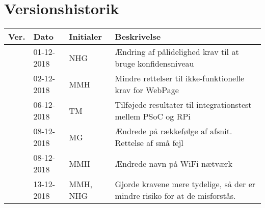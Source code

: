 \documentclass[Kravspecifikation/Kravspec_Main.tex]{subfiles}
\begin{document}
\section{Versionshistorik}
\begin{longtable}{|L{0.07\textwidth}|L{0.15\textwidth}|L{0.13\textwidth}|L{0.55\textwidth}|}
        \hline
        \textbf{Ver.} & \textbf{Dato} & \textbf{Initialer} & \textbf{Beskrivelse}  \\ \hline
         & 01-12-2018 & NHG & Ændring af pålidelighed krav til at bruge konfidensniveau \\ \hline
         & 02-12-2018 & MMH & Mindre rettelser til ikke-funktionelle krav for WebPage \\ \hline
         & 06-12-2018 & TM & Tilføjede resultater til integrationstest mellem PSoC og RPi \\ \hline
         & 08-12-2018 & MG & Ændrede på rækkefølge af afsnit. Rettelse af små fejl  \\ \hline
         & 08-12-2018 & MMH & Ændrede navn på WiFi nætværk \\ \hline
         & 13-12-2018 & MMH, NHG & Gjorde kravene mere tydelige, så der er mindre risiko for at de misforstås. \\ \hline
\end{longtable}
\end{document}
